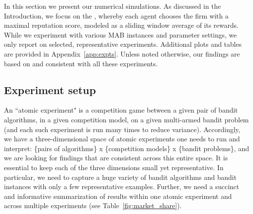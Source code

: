 \documentclass[../competing_bandits.tex]{subfiles}
\begin{document}
In this section we present our numerical simulations. As discussed in the Introduction, we focus on the \ExptsModel, whereby each agent chooses the firm with a maximal reputation score, modeled as a sliding window average of its rewards. While we experiment with various MAB instances and parameter settings, we only report on selected, representative experiments. Additional plots and tables are provided in Appendix~\ref{app:expts}. Unless noted otherwise, our findings are based on and consistent with all these experiments.


\subsection{Experiment setup}
\label{expts-prelims}



 An ``atomic experiment" is a competition game between a given pair of bandit algorithms, in a given competition model, on a given
multi-armed bandit problem (and each such experiment is run many times to reduce variance). Accordingly, we have a three-dimensional space of atomic experiments one needs to run and interpret: \{pairs of algorithms\} x \{competition models\} x \{bandit problems\}, and we are looking for findings that are consistent across this entire space. It is essential to keep each of the three dimensions small yet representative. In particular, we need to capture a huge variety of bandit algorithms and bandit instances with only a few representative examples. Further, we need a succinct and informative summarization of results within one atomic experiment and across multiple experiments (\eg see Table~\ref{fig:market_share}).
\end{document}
